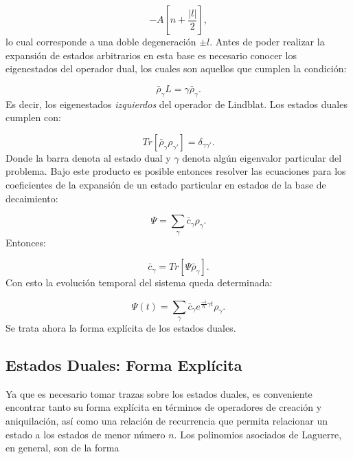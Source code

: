 \documentclass[a4paper,10pt]{report}
\begin{document}
\begin{equation}
 -A[n+\frac{|l|}{2}],
\end{equation}lo cual corresponde a una doble degeneración $\pm l$. Antes de poder realizar la expansión de estados arbitrarios en esta base es necesario conocer los eigenestados del operador dual, los cuales son aquellos que cumplen la condición\cite{EnglertDB}:

\begin{equation}
\bar{\rho}_\gamma L = \gamma\bar{\rho}_\gamma.
\end{equation} Es decir, los eigenestados \textit{izquierdos} del operador de Lindblat. Los estados duales cumplen con:

\begin{equation}
Tr[\bar{\rho}_{\gamma}\rho_{\gamma'}] = \delta_{\gamma\gamma'}.
\end{equation} Donde la barra denota al estado dual y $\gamma$ denota algún eigenvalor particular del problema. Bajo este producto es posible entonces resolver las ecuaciones para los coeficientes de la expansión de un estado particular en estados de la base de decaimiento:

\begin{equation}
\Psi = \sum_{\gamma}\bar{c}_\gamma \rho_\gamma.
\end{equation} Entonces:

\begin{equation}
\bar{c}_\gamma = Tr[\Psi\bar{\rho}_{\gamma}].
\end{equation} Con esto la evolución temporal del sistema queda determinada:

\begin{equation}
\Psi(t) = \sum_\gamma \bar{c}_\gamma e^{\frac{-i}{\hbar} \gamma t} \rho_{\gamma}.
\end{equation} Se trata ahora la forma explícita de los estados duales.

\subsection{Estados Duales: Forma Explícita}

Ya que es necesario tomar trazas sobre los estados duales, es conveniente encontrar tanto su forma explícita en términos de operadores de creación y aniquilación, así como una relación de recurrencia que permita relacionar un estado a los estados de menor número $n$. Los polinomios asociados de Laguerre, en general, son de la forma\cite{ArfkenMM}
\end{document}
